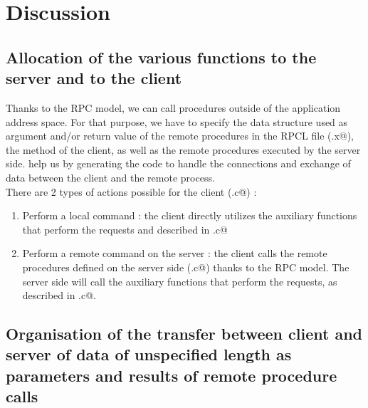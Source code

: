 \documentclass{article}
\begin{document}
\newpage


\section{Discussion}

\subsection{Allocation of the various functions to the server and to the client}
Thanks to the RPC model, we can call procedures outside of the application address space. For that purpose, we have to specify the data structure used as argument and/or return value of the remote procedures in the RPCL file (\verb@rpspec.x@), the \verb@main@ method of the client, as well as the remote procedures executed by the server side. \verb@RPCGEN@ help us by generating the code to handle the connections and exchange of data between the client and the remote process.\\

There are 2 types of actions possible for the client (\verb@myftp.c@) :
\begin{enumerate}
\item Perform a local command : the client directly utilizes the auxiliary functions that perform the requests and described in \verb@utils.c@
\item Perform a remote command on the server : the client calls the remote procedures defined on the server side (\verb@myftpd.c@) thanks to the RPC model. The server side will call the auxiliary functions that perform the requests, as described in \verb@utils.c@.
\end{enumerate}

\subsection{Organisation of the transfer between client and server of data of unspecified length as parameters and results of remote procedure calls}
\end{document}
